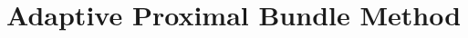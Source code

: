 \documentclass[11pt,letterpaper]{article}
\newcommand*{\QEDA}{\hfill\hbox{\vrule width1.0ex height1.0ex}}
\newtheorem{lemma}[thm]{Lemma}
\newtheorem{proposition}[thm]{Proposition}
\newcommand{\vgap}{\vspace{.1in}}
\begin{document}
	






\section{Adaptive Proximal Bundle Method}\label{sec:APBM}
\end{document}
